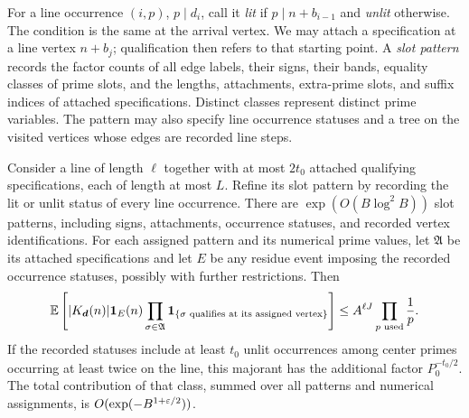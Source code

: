 For a line occurrence $(i,p)$, $p\mid d_i$, call it \emph{lit} if
$p\mid n+b_{i-1}$ and \emph{unlit} otherwise.  The condition is the
same at the arrival vertex.  We may attach a specification at a
line vertex $n+b_j$; qualification then refers to that starting
point.  A \emph{slot pattern} records the factor counts of all edge
labels, their signs, their bands, equality classes of prime slots,
and the lengths, attachments, extra-prime slots, and suffix indices
of attached specifications.  Distinct classes represent distinct
prime variables.  The pattern may also specify line occurrence
statuses and a tree on the visited vertices whose edges are recorded
line steps.

\begin{lemma}\label{lem:crude-count}
Consider a line of length $\ell$ together with at most $2t_0$
attached qualifying specifications, each of length at most $L$.
Refine its slot pattern by recording the lit or unlit status of every
line occurrence.
There are $\exp(O(B\log^2B))$ slot patterns, including signs,
attachments, occurrence statuses, and recorded vertex identifications.
For each assigned pattern and its numerical prime values, let
$\mathfrak A$ be its attached specifications and let $E$ be any
residue event imposing the recorded occurrence statuses, possibly
with further restrictions.  Then
\begin{equation}\label{eq:absolute-pattern-majorant}
 \mathbb E\left[|K_{\boldsymbol d}(n)|\mathbf 1_E(n)
     \prod_{\sigma\in\mathfrak A}
       \mathbf 1_{\{\sigma\text{ qualifies at its assigned vertex}\}}\right]
 \le A^{\ell J}\prod_{p\text{ used}}\frac1p.
\end{equation}
If the recorded statuses include at least $t_0$ unlit occurrences
among center primes occurring at least twice on the line, this majorant has the additional
factor $P_0^{-t_0/2}$.  The total contribution of that class, summed
over all patterns and numerical assignments, is
$O(\exp(-B^{1+\varepsilon/2}))$.
\end{lemma}

